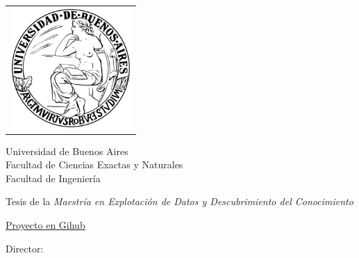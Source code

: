 \newcommand{\HRule}{\rule{\linewidth}{0.2mm}}
%
\thispagestyle{empty}

\begin{center}\leavevmode

\vspace{-2cm}

\begin{tabular}{l}
\includegraphics[width=4.6cm]{./images/logouba.png}
\end{tabular}


{\large \sc Universidad de Buenos Aires\\Facultad de Ciencias Exactas y Naturales \\ Facultad de Ingeniería}

\vspace{5.0cm}

\begin{huge}
\textbf{\tituloTesis}
\end{huge}

\vspace{2cm}

{\large Tesis de la \textit{Maestría en Explotación de Datos y Descubrimiento del Conocimiento}}
\vspace{2cm}

{\large \href{https://github.com/adrianmarino/thesis-paper}{Proyecto en Gihub}}

\vspace{2cm}

{\Large \autor}

\end{center}

\vfill

{\large

{Director: \director}

\vspace{.2cm}

\lugar
}

\newpage\thispagestyle{empty}
